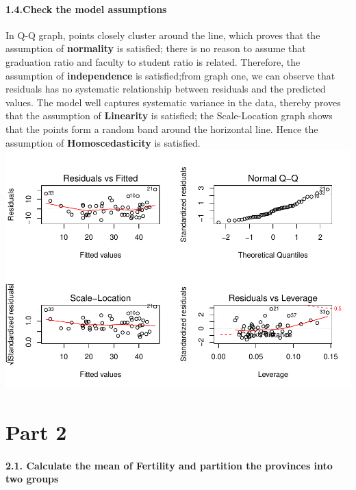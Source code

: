 \documentclass[]{article}
\let\oldparagraph\paragraph
\renewcommand{\paragraph}[1]{\oldparagraph{#1}\mbox{}}
\begin{document}
\hypertarget{check-the-model-assumptions}{%
\paragraph{\texorpdfstring{\textbf{1.4.Check the model
assumptions}}{1.4.Check the model assumptions}}\label{check-the-model-assumptions}}

In Q-Q graph, points closely cluster around the line, which proves that
the assumption of \textbf{normality} is satisfied; there is no reason to
assume that graduation ratio and faculty to student ratio is related.
Therefore, the assumption of \textbf{independence} is satisfied;from
graph one, we can observe that residuals has no systematic relationship
between residuals and the predicted values. The model well captures
systematic variance in the data, thereby proves that the assumption of
\textbf{Linearity} is satisfied; the Scale-Location graph shows that the
points form a random band around the horizontal line. Hence the
assumption of \textbf{Homoscedasticity} is satisfied.
\includegraphics{Assign3_Rmarkdown备份_files/figure-latex/unnamed-chunk-3-1.pdf}

\hypertarget{part-2}{%
\section{Part 2}\label{part-2}}

\hypertarget{calculate-the-mean-of-fertility-and-partition-the-provinces-into-two-groups}{%
\paragraph{\texorpdfstring{\textbf{2.1. Calculate the mean of Fertility
and partition the provinces into two
groups}}{2.1. Calculate the mean of Fertility and partition the provinces into two groups}}\label{calculate-the-mean-of-fertility-and-partition-the-provinces-into-two-groups}}
\end{document}
